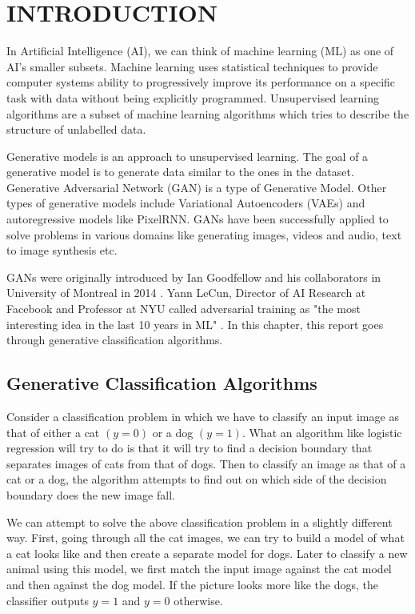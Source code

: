 \chapter{INTRODUCTION}
\begin{onehalfspace}
    In Artificial Intelligence (AI), we can think of machine learning (ML) as one 
    of AI's smaller subsets. Machine learning uses statistical techniques to 
    provide computer systems ability to progressively improve its performance on a specific 
    task with data without being explicitly programmed. \cite{Samuel59somestudies} 
    Unsupervised learning algorithms are a subset of machine learning algorithms 
    which tries to describe the structure of unlabelled data. 

    Generative models \cite{openai_genmodels} is an approach to unsupervised 
    learning. The goal of a generative model is to generate data similar to the ones 
    in the dataset. 
    Generative Adversarial Network (GAN) is a type of Generative Model. Other types 
    of generative models include Variational Autoencoders (VAEs) and autoregressive 
    models like PixelRNN. GANs have been successfully applied to solve problems in 
    various domains like generating images, videos and audio, text to image 
    synthesis etc.

    GANs were originally introduced by Ian Goodfellow and his collaborators in 
    University of Montreal in 2014 \cite{gans_basic}.
    Yann LeCun, Director of AI Research at Facebook and Professor at NYU called 
    adversarial training as {"the most interesting idea in the last 10 years 
    in ML"} \cite{yanlecunn_gans}. In this chapter, this report goes through 
    generative classification algorithms.

    \section{Generative Classification Algorithms}
    Consider a classification problem in which we have to classify an input 
    image as that of either a cat \((y = 0)\) or a dog \((y = 1)\).  What an algorithm 
    like logistic regression will try to do is that it will try to find a 
    decision boundary that separates images of cats from that of dogs. Then to 
    classify an image as that of a cat or a dog, the algorithm attempts to find 
    out on which side of the decision boundary does the new image fall.

    We can attempt to solve the above classification problem in a slightly 
    different way. First, going through all the cat images, we can try to build 
    a model of what a cat looks like and then create a separate model for dogs. 
    Later to classify a new animal using this model, we first match the input 
    image against the cat model and then against the dog model. If the picture 
    looks more like the dogs, the classifier outputs \(y = 1\) and \(y = 0\) otherwise.


\end{onehalfspace}
